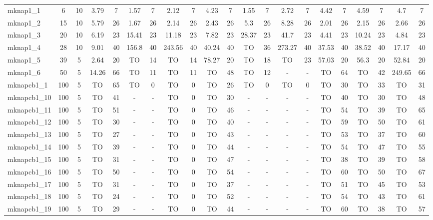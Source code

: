 \begin{sidewaystable}[!ht]
{\begin{tabular}{lcccccccccccccccccccc}
mknap1\_1 & 6 & 10 & 3.79 & 7 & 1.57 & 7 & 2.12 & 7 & 4.23 & 7 & 1.55 & 7 & 2.72 & 7 & 4.42 & 7 & 4.59 & 7 & 4.7 & 7 \\
mknap1\_2 & 15 & 10 & 5.79 & 26 & 1.67 & 26 & 2.14 & 26 & 2.43 & 26 & 5.3 & 26 & 8.28 & 26 & 2.01 & 26 & 2.15 & 26 & 2.66 & 26 \\
mknap1\_3 & 20 & 10 & 6.19 & 23 & 15.41 & 23 & 11.18 & 23 & 7.82 & 23 & 28.37 & 23 & 41.7 & 23 & 4.41 & 23 & 10.24 & 23 & 4.84 & 23 \\
mknap1\_4 & 28 & 10 & 9.01 & 40 & 156.8 & 40 & 243.56 & 40 & 40.24 & 40 & TO & 36 & 273.27 & 40 & 37.53 & 40 & 38.52 & 40 & 17.17 & 40 \\
mknap1\_5 & 39 & 5 & 2.64 & 20 & TO & 14 & TO & 14 & 78.27 & 20 & TO & 18 & TO & 23 & 57.03 & 20 & 56.3 & 20 & 52.84 & 20 \\
mknap1\_6 & 50 & 5 & 14.26 & 66 & TO & 11 & TO & 11 & TO & 48 & TO & 12 &  - &  - & TO & 64 & TO & 42 & 249.65 & 66 \\
mknapcb1\_1 & 100 & 5 & TO & 65 & TO & 0 & TO & 0 & TO & 26 & TO & 0 & TO & 0 & TO & 30 & TO & 33 & TO & 31 \\
mknapcb1\_10 & 100 & 5 & TO & 41 &  - &  - & TO & 0 & TO & 30 &  - &  - &  - &  - & TO & 40 & TO & 30 & TO & 48 \\
mknapcb1\_11 & 100 & 5 & TO & 51 &  - &  - & TO & 0 & TO & 46 &  - &  - &  - &  - & TO & 54 & TO & 39 & TO & 65 \\
mknapcb1\_12 & 100 & 5 & TO & 30 &  - &  - & TO & 0 & TO & 40 &  - &  - &  - &  - & TO & 59 & TO & 50 & TO & 61 \\
mknapcb1\_13 & 100 & 5 & TO & 27 &  - &  - & TO & 0 & TO & 43 &  - &  - &  - &  - & TO & 53 & TO & 37 & TO & 60 \\
mknapcb1\_14 & 100 & 5 & TO & 39 &  - &  - & TO & 0 & TO & 44 &  - &  - &  - &  - & TO & 54 & TO & 47 & TO & 55 \\
mknapcb1\_15 & 100 & 5 & TO & 31 &  - &  - & TO & 0 & TO & 47 &  - &  - &  - &  - & TO & 38 & TO & 39 & TO & 58 \\
mknapcb1\_16 & 100 & 5 & TO & 50 &  - &  - & TO & 0 & TO & 54 &  - &  - &  - &  - & TO & 60 & TO & 50 & TO & 67 \\
mknapcb1\_17 & 100 & 5 & TO & 31 &  - &  - & TO & 0 & TO & 37 &  - &  - &  - &  - & TO & 51 & TO & 45 & TO & 53 \\
mknapcb1\_18 & 100 & 5 & TO & 24 &  - &  - & TO & 0 & TO & 52 &  - &  - &  - &  - & TO & 54 & TO & 43 & TO & 61 \\
mknapcb1\_19 & 100 & 5 & TO & 29 &  - &  - & TO & 0 & TO & 44 &  - &  - &  - &  - & TO & 60 & TO & 38 & TO & 57 \\

\end{tabular}}
\end{sidewaystable}
